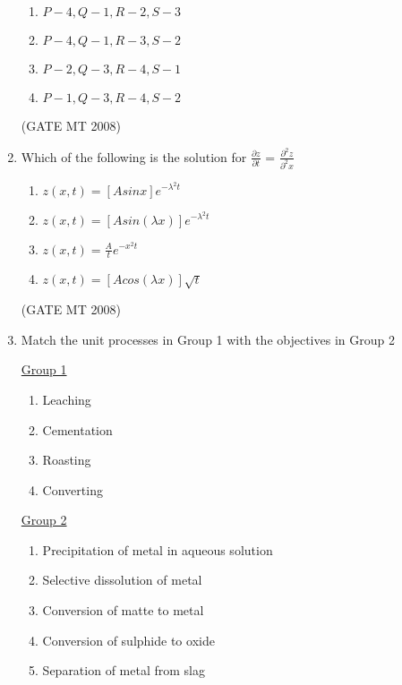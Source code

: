 \documentclass[11pt, letterpaper]{article}
\theoremstyle{remark}
\begin{document}
\begin{enumerate}
\begin{multicols}{2}
\begin{enumerate}
\item $P-4, Q-1, R-2, S-3$
\item $P-4, Q-1, R-3, S-2$
\item $P-2, Q-3, R-4, S-1$
\item $P-1, Q-3, R-4, S-2$
\end{enumerate}
\end{multicols}

\hfill(GATE MT 2008)

\item Which of the following is the solution for {\LARGE $\frac{\partial z}{\partial t}$ = $\frac{\partial^2z}{\partial^2x}$}

\begin{multicols}{2}
\begin{enumerate}
\item {\large$z(x,t)= [Asinx]$$e^{-\lambda^2 t}$}
\item {\large$z(x,t)= [Asin(\lambda x)]$$e^{-\lambda^2 t}$} 
\item {\large$z(x,t)=\frac{A}{t}$$e^{-x^2 t}$}
\item {\large$z(x,t)= [Acos(\lambda x)]$$\sqrt{t}$}
\end{enumerate}
\end{multicols}

\hfill(GATE MT 2008)

\item Match the unit processes in Group 1 with the objectives in Group 2
\begin{multicols}{2}
\underline{Group 1}
\begin{enumerate}[label=(\Alph*), start=16]
\item Leaching
\item Cementation
\item Roasting
\item Converting
\end{enumerate}

\underline{Group 2}
\begin{enumerate}[label=(\arabic*), start=1]
\item Precipitation of metal in aqueous solution
\item Selective dissolution of metal
\item Conversion of matte to metal
\item Conversion of sulphide to oxide 
\item Separation of metal from slag
\end{enumerate}
\end{multicols}


\end{enumerate}
\end{document}
